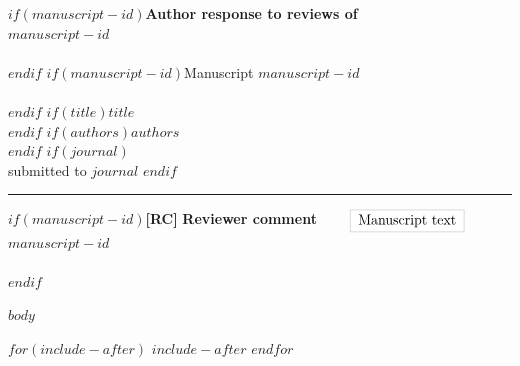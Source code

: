 \documentclass[$if(class)$$class$$endif$]{article}
\begin{document}
$if(manuscript-id)${\Large\bf Author response to reviews of}\\[1em]$manuscript-id$\\ \\$endif$
$if(manuscript-id)$Manuscript $manuscript-id$\\ \\$endif$
$if(title)${\Large $title$}\\[1em]$endif$
$if(authors)${$authors$}\\$endif$
$if(journal)${\\ submitted to \it $journal$ }$endif$\\
\hrule

$if(manuscript-id)$\hfill {\bfseries [RC]\hspace{0.5em}} \textbf{Reviewer comment}%
\(\qquad \fcolorbox{black!25!white}{white}{\hspace{0.25em}Manuscript text\hspace{0.25em}}\)$manuscript-id$\\ \\$endif$

\vspace{2em}

$body$

$for(include-after)$
  $include-after$
$endfor$
\end{document}
